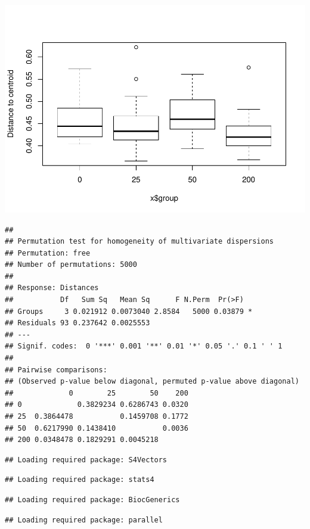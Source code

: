 \documentclass[]{article}
\begin{document}
\includegraphics{Analyses_and_Plots_files/figure-latex/betadispersion-1.pdf}

\begin{verbatim}
## 
## Permutation test for homogeneity of multivariate dispersions
## Permutation: free
## Number of permutations: 5000
## 
## Response: Distances
##           Df   Sum Sq   Mean Sq      F N.Perm  Pr(>F)  
## Groups     3 0.021912 0.0073040 2.8584   5000 0.03879 *
## Residuals 93 0.237642 0.0025553                        
## ---
## Signif. codes:  0 '***' 0.001 '**' 0.01 '*' 0.05 '.' 0.1 ' ' 1
## 
## Pairwise comparisons:
## (Observed p-value below diagonal, permuted p-value above diagonal)
##             0        25        50    200
## 0             0.3829234 0.6286743 0.0320
## 25  0.3864478           0.1459708 0.1772
## 50  0.6217990 0.1438410           0.0036
## 200 0.0348478 0.1829291 0.0045218
\end{verbatim}

\begin{verbatim}
## Loading required package: S4Vectors
\end{verbatim}

\begin{verbatim}
## Loading required package: stats4
\end{verbatim}

\begin{verbatim}
## Loading required package: BiocGenerics
\end{verbatim}

\begin{verbatim}
## Loading required package: parallel
\end{verbatim}
\end{document}
